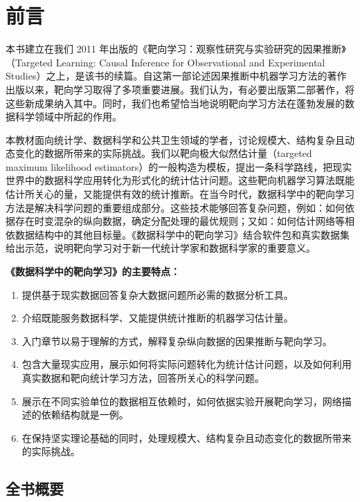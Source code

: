 
\chapter*{前言}

本书建立在我们 2011 年出版的《靶向学习：观察性研究与实验研究的因果推断》（Targeted Learning: Causal Inference for Observational and Experimental Studies）之上，是该书的续篇。自这第一部论述因果推断中机器学习方法的著作出版以来，靶向学习取得了多项重要进展。我们认为，有必要出版第二部著作，将这些新成果纳入其中。同时，我们也希望恰当地说明靶向学习方法在蓬勃发展的数据科学领域中所起的作用。

本教材面向统计学、数据科学和公共卫生领域的学者，讨论规模大、结构复杂且动态变化的数据所带来的实际挑战。我们以靶向极大似然估计量（targeted maximum likelihood estimators）的一般构造为模板，提出一条科学路线，把现实世界中的数据科学应用转化为形式化的统计估计问题。这些靶向机器学习算法既能估计所关心的量，又能提供有效的统计推断。在当今时代，数据科学中的靶向学习方法是解决科学问题的重要组成部分。这些技术能够回答复杂问题，例如：如何依据存在时变混杂的纵向数据，确定分配处理的最优规则；又如：如何估计网络等相依数据结构中的其他目标量。《数据科学中的靶向学习》结合软件包和真实数据集给出示范，说明靶向学习对于新一代统计学家和数据科学家的重要意义。

\begin{sourcebox}
\textbf{《数据科学中的靶向学习》的主要特点：}
\begin{enumerate}
\item 提供基于现实数据回答复杂大数据问题所必需的数据分析工具。
\item 介绍既能服务数据科学、又能提供统计推断的机器学习估计量。
\item 入门章节以易于理解的方式，解释复杂纵向数据的因果推断与靶向学习。
\item 包含大量现实应用，展示如何将实际问题转化为统计估计问题，以及如何利用真实数据和靶向统计学习方法，回答所关心的科学问题。
\item 展示在不同实验单位的数据相互依赖时，如何依据实验开展靶向学习，网络描述的依赖结构就是一例。
\item 在保持坚实理论基础的同时，处理规模大、结构复杂且动态变化的数据所带来的实际挑战。
\end{enumerate}
\end{sourcebox}

\section*{全书概要}

